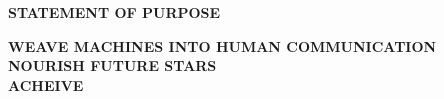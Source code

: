 \documentclass[12pt, a4paper]{article}
\begin{document}
\begin{center}
{\Large \textbf{STATEMENT OF PURPOSE}}
\end{center}


\noindent 


\normalsize
\noindent
 
% 

\noindent
\textbf{WEAVE MACHINES INTO HUMAN COMMUNICATION}\\
 

%

\noindent
\textbf{NOURISH FUTURE STARS}\\


%


\noindent
\textbf{ACHEIVE }\\

%
%
%
%
%
%

\noindent

\end{document}
